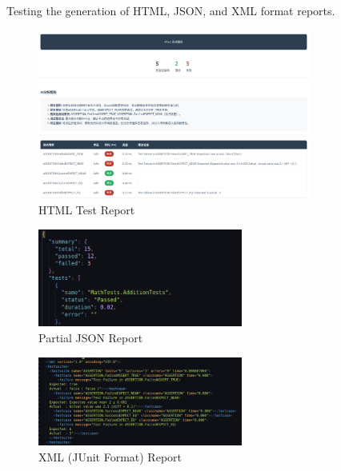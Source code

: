 \documentclass{article}
\begin{document}
Testing the generation of HTML, JSON, and XML format reports.
\begin{figure}[H]
    \centering
    \includegraphics[width=0.8\textwidth]{img/html.png}
    \caption{HTML Test Report}
    \label{fig: HTML Test Report}
\end{figure}
\begin{figure}[H]
    \centering
    \includegraphics[width=0.6\textwidth]{img/json.png}
    \caption{Partial JSON Report}
    \label{fig: Partial JSON Report}
\end{figure}

\begin{figure}[H]
    \centering
    \includegraphics[width=0.6\textwidth]{img/xml.png}
    \caption{XML (JUnit Format) Report}
    \label{fig: XML (JUnit Format) Report}
\end{figure}
\end{document}
